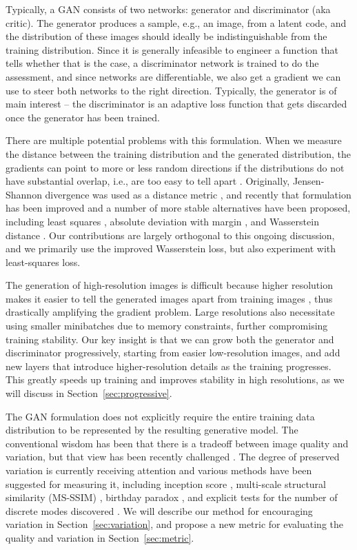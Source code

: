 Typically, a GAN consists of two networks: generator and discriminator (aka critic). The generator produces a sample, e.g., an image, from a latent code, and the distribution of these images should ideally be indistinguishable from the training distribution. Since it is generally infeasible to engineer a function that tells whether that is the case, a discriminator network is trained to do the assessment, and since networks are differentiable, we also get a gradient we can use to steer both networks to the right direction. Typically, the generator is of main interest -- the discriminator is an adaptive loss function that gets discarded once the generator has been trained.

There are multiple potential problems with this formulation. When we measure the distance between the training distribution and the generated distribution, the gradients can point to more or less random directions if the distributions do not have substantial overlap, i.e., are too easy to tell apart \citep{Arjovsky2017A}. Originally, Jensen-Shannon divergence was used as a distance metric \citep{Goodfellow2014}, and recently that formulation has been improved \citep{Hjelm2017} and a number of more stable alternatives have been proposed, including least squares \citep{Mao2016}, absolute deviation with margin \citep{Zhao2016}, and Wasserstein distance \citep{Arjovsky2017,Gulrajani2017}. Our contributions are largely orthogonal to this ongoing discussion, and we primarily use the improved Wasserstein loss, but also experiment with least-squares loss.

The generation of high-resolution images is difficult because higher resolution makes it easier to tell the generated images apart from training images \citep{Odena2017}, thus drastically amplifying the gradient problem. Large resolutions also necessitate using smaller minibatches due to memory constraints, further compromising training stability. Our key insight is that we can grow both the generator and discriminator progressively, starting from easier low-resolution images, and add new layers that introduce higher-resolution details as the training progresses. This greatly speeds up training and improves stability in high resolutions, as we will discuss in Section~\ref{sec:progressive}.

The GAN formulation does not explicitly require the entire training data distribution to be represented by the resulting generative model. The conventional wisdom has been that there is a tradeoff between image quality and variation, but that view has been recently challenged \citep{Odena2017}. The degree of preserved variation is currently receiving attention and various methods have been suggested for measuring it, including inception score \citep{Salimans2016B}, multi-scale structural similarity (MS-SSIM) \citep{Odena2017,Wang2003}, birthday paradox \citep{Arora2017b}, and explicit tests for the number of discrete modes discovered \citep{Metz2016}. We will describe our method for encouraging variation in Section~\ref{sec:variation}, and propose a new metric for evaluating the quality and variation in Section~\ref{sec:metric}.  

